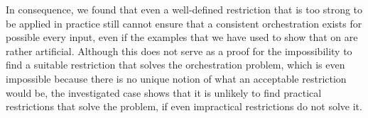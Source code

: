 In consequence, we found that even a well-defined restriction that is too strong to be applied in practice still cannot ensure that a consistent orchestration exists for possible every input, even if the examples that we have used to show that on are rather artificial.
Although this does not serve as a proof for the impossibility to find a suitable restriction that solves the orchestration problem, which is even impossible because there is no unique notion of what an acceptable restriction would be, the investigated case shows that it is unlikely to find practical restrictions that solve the problem, if even impractical restrictions do not solve it.



